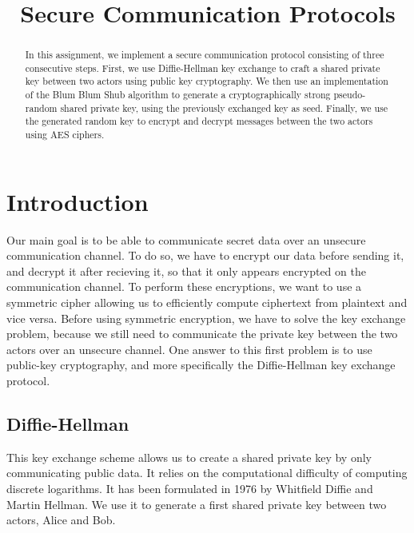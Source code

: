 \documentclass{article}
\title{\textbf{Secure Communication Protocols}}
\author{}
\date{}
\begin{document}
\maketitle \thispagestyle{fancy}

\begin{abstract}
    In this assignment, we implement a secure communication protocol consisting of three consecutive steps. First, we use Diffie-Hellman\cite{Diffie76newdirections}\cite{Graham78securecommunications} key exchange to craft a shared private key between two actors using public key cryptography. We then use an implementation of the Blum Blum Shub\cite{Blum1986} algorithm to generate a cryptographically strong pseudo-random shared private key, using the previously exchanged key as seed. Finally, we use the generated random key to encrypt and decrypt messages between the two actors using AES\cite{Daemen99aesproposal} ciphers.
\end{abstract}

\section{Introduction}

Our main goal is to be able to communicate secret data over an unsecure communication channel. To do so, we have to encrypt our data before sending it, and decrypt it after recieving it, so that it only appears encrypted on the communication channel.
To perform these encryptions, we want to use a symmetric cipher allowing us to efficiently compute ciphertext from plaintext and vice versa. Before using symmetric encryption, we have to solve the key exchange problem, because we still need to communicate the private key between the two actors over an unsecure channel.
One answer to this first problem is to use public-key cryptography, and more specifically the Diffie-Hellman key exchange protocol. 

\subsection{Diffie-Hellman}

This key exchange scheme allows us to create a shared private key by only communicating public data. It relies on the computational difficulty of computing discrete logarithms. It has been formulated in 1976 by Whitfield Diffie and Martin Hellman\cite{Diffie76newdirections}\cite{Graham78securecommunications}. We use it to generate a first shared private key between two actors, Alice and Bob.
\end{document}
